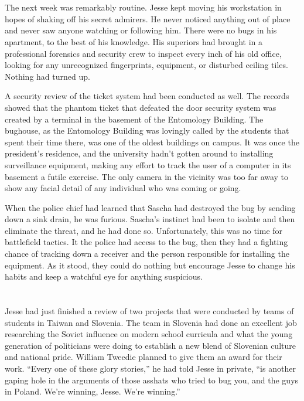 \documentclass[12pt]{book}
\begin{document}
\chapter{}

The next week was remarkably routine.  Jesse kept moving his workstation in hopes of shaking off his secret admirers.  He never noticed anything out of place and never saw anyone watching or following him.  There were no bugs in his apartment, to the best of his knowledge.  His superiors had brought in a professional forensics and security crew to inspect every inch of his old office, looking for any unrecognized fingerprints, equipment, or disturbed ceiling tiles.  Nothing had turned up.

A security review of the ticket system had been conducted as well.  The records showed that the phantom ticket that defeated the door security system was created by a terminal in the basement of the Entomology Building.  The bughouse, as the Entomology Building was lovingly called by the students that spent their time there, was one of the oldest buildings on campus.  It was once the president's residence, and the university hadn't gotten around to installing surveillance equipment, making any effort to track the user of a computer in its basement a futile exercise.  The only camera in the vicinity was too far away to show any facial detail of any individual who was coming or going.

When the police chief had learned that Sascha had destroyed the bug by sending down a sink drain, he was furious.  Sascha's instinct had been to isolate and then eliminate the threat, and he had done so.  Unfortunately, this was no time for battlefield tactics.  It the police had access to the bug, then they had a fighting chance of tracking down a receiver and the person responsible for installing the equipment.  As it stood, they could do nothing but encourage Jesse to change his habits and keep a watchful eye for anything suspicious.

\chapter{}

Jesse had just finished a review of two projects that were conducted by teams of students in Taiwan and Slovenia.  The team in Slovenia had done an excellent job researching the Soviet influence on modern school curricula and what the young generation of politicians were doing to establish a new blend of Slovenian culture and national pride.  William Tweedie planned to give them an award for their work.  ``Every one of these glory stories,'' he had told Jesse in private, ``is another gaping hole in the arguments of those asshats who tried to bug you, and the guys in Poland.  We're winning, Jesse.  We're winning.''
\end{document}
